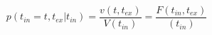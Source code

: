 \begin{equation}
p(t_{in}=t,t_{ex}|t_{in})  = \frac{v(t,t_{ex})}{V(t_{in})}= \frac{F(t_{in},t_{ex})}{(t_{in})}
\end{equation}